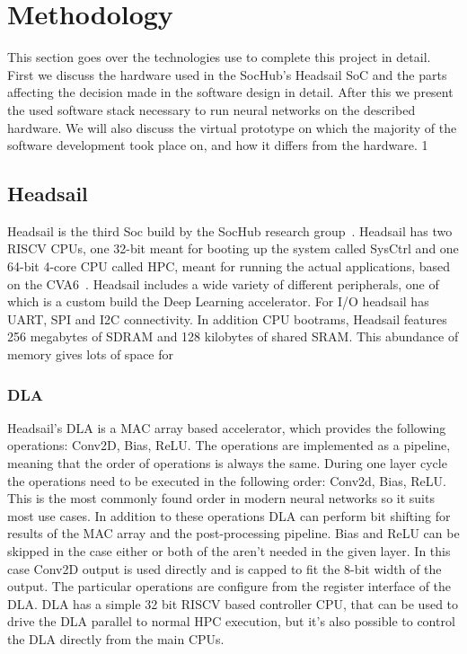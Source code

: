 \documentclass[12pt,a4paper,english
]{tunithesis}
\begin{document}
\chapter{Methodology}
This section goes over the technologies use to complete this project in detail. First we discuss the hardware used in the SocHub's Headsail SoC and the parts affecting the decision made in the software design in detail. After this we present the used software stack necessary to run neural networks on the described hardware. We will also discuss the virtual prototype on which the majority of the software development took place on, and how it differs from the hardware.   1
\label{ch:methodology}

\section{Headsail}
Headsail is the third Soc build by the SocHub research group~\parencite{Ballast}. Headsail has two RISCV CPUs, one 32-bit meant for booting up the system called SysCtrl and one 64-bit 4-core CPU called HPC, meant for running the actual applications, based on the CVA6~\cite{zaruba2019costCVA6}.
Headsail includes a wide variety of different peripherals, one of which is a custom build the Deep Learning accelerator.
For I/O headsail  has UART, SPI and I2C connectivity.
In addition CPU bootrams, Headsail features 256 megabytes of SDRAM and 128 kilobytes of shared SRAM. This abundance of memory gives lots of space for

\subsection{DLA}
Headsail's DLA is a MAC array based accelerator, which provides the following operations: Conv2D, Bias, ReLU. The operations are implemented as a pipeline, meaning that the order of operations is always the same. During one layer cycle the operations need to be executed in the following order: Conv2d, Bias, ReLU. This is the most commonly found order in modern neural networks so it suits most use cases. In addition to these operations DLA can perform bit shifting for results of the MAC array and the post-processing pipeline.
Bias and ReLU can be skipped in the case either or both of the aren't needed in the given layer. In this case Conv2D output is used directly and is capped to fit the 8-bit width of the output.
The particular operations are configure from the register interface of the DLA.
DLA has a simple 32 bit RISCV based controller CPU, that can be used to drive the DLA parallel to normal HPC execution, but it's also possible to control the DLA directly from the main CPUs.
\end{document}
